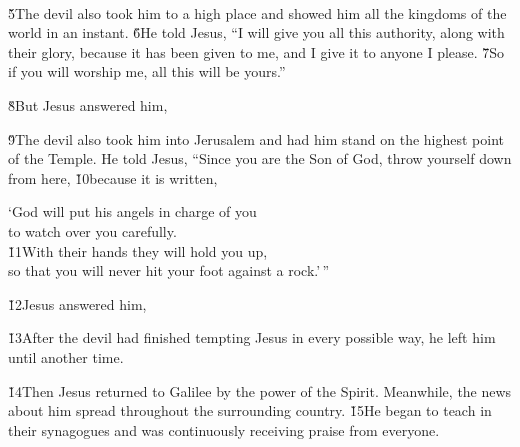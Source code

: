 \begin{poetry}
\poeml {} \\
\poemll    {}
\end{poetry}

\v{5}The devil also took him to a high place and showed him all the kingdoms of the world in an instant. \v{6}He told Jesus, ``I will give you all this authority, along with their glory, because it has been given to me, and I give it to anyone I please. \v{7}So if you will worship me, all this will be yours.''

\v{8}But Jesus answered him, 

\begin{poetry}
\poeml {}
\end{poetry}

\v{9}The devil also took him into Jerusalem and had him stand on the highest point of the Temple. He told Jesus, ``Since you are the Son of God, throw yourself down from here, \v{10}because it is written,

\begin{poetry}
\poeml `God will put his angels in charge of you \\
\poemll    to watch over you carefully. \\
\poeml \v{11}With their hands they will hold you up, \\
\poemll    so that you will never hit your foot against a rock.'\,''
\end{poetry}

\v{12}Jesus answered him, 

\v{13}After the devil had finished tempting Jesus in every possible way, he left him until another time.

\v{14}Then Jesus returned to Galilee by the power of the Spirit. Meanwhile, the news about him spread throughout the surrounding country. \v{15}He began to teach in their synagogues and was continuously receiving praise from everyone.

